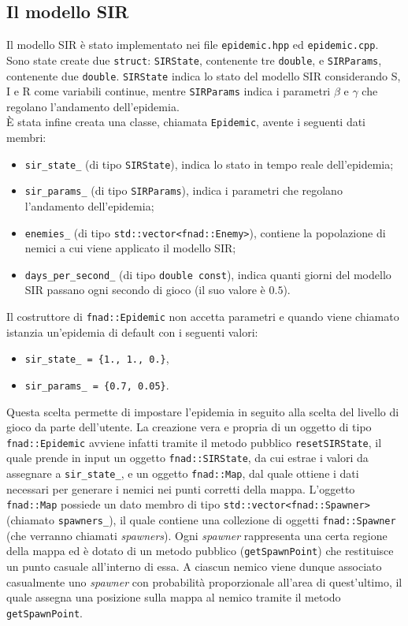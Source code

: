 \documentclass{article}
\begin{document}
\subsection{Il modello SIR}\label{section:sir}
Il modello SIR è stato implementato nei file \verb|epidemic.hpp| ed \verb|epidemic.cpp|. Sono state create due \verb|struct|: \verb|SIRState|, contenente tre \verb|double|, e \verb|SIRParams|, contenente due \verb|double|. \verb|SIRState| indica lo stato del modello SIR considerando S, I e R come variabili continue, mentre \verb|SIRParams| indica i parametri $\beta$ e $\gamma$ che regolano l'andamento dell'epidemia.\\
È stata infine creata una classe, chiamata \verb|Epidemic|, avente i seguenti dati membri:
\begin{itemize}
    \item \verb|sir_state_| (di tipo \verb|SIRState|), indica lo stato in tempo reale dell'epidemia;
    \item \verb|sir_params_| (di tipo \verb|SIRParams|), indica i parametri che regolano l'andamento dell'epidemia;
    \item  \verb|enemies_| (di tipo \verb|std::vector<fnad::Enemy>|), contiene la popolazione di nemici a cui viene applicato il modello SIR;
    \item \verb|days_per_second_| (di tipo \verb|double const|), indica quanti giorni del modello SIR passano ogni secondo di gioco (il suo valore è $0.5$).
\end{itemize}
Il costruttore di \verb|fnad::Epidemic| non accetta parametri e quando viene chiamato istanzia un'epidemia di default con i seguenti valori:
\begin{itemize}
    \item  \verb|sir_state_ = {1., 1., 0.}|,
    \item \verb|sir_params_ = {0.7, 0.05}|.
\end{itemize}
Questa scelta permette di impostare l'epidemia in seguito alla scelta del livello di gioco da parte dell'utente. La creazione vera e propria di un oggetto di tipo \verb|fnad::Epidemic| avviene infatti tramite il metodo pubblico \verb|resetSIRState|, il quale prende in input un oggetto \verb|fnad::SIRState|, da cui estrae i valori da assegnare a \verb|sir_state_|, e un oggetto \verb|fnad::Map|, dal quale ottiene i dati necessari per generare i nemici nei punti corretti della mappa. L'oggetto \verb|fnad::Map| possiede un dato membro di tipo \verb|std::vector<fnad::Spawner>| (chiamato \verb|spawners_|), il quale contiene una collezione di oggetti \verb|fnad::Spawner| (che verranno chiamati \textit{spawners}). Ogni \textit{spawner} rappresenta una certa regione della mappa ed è dotato di un metodo pubblico (\verb|getSpawnPoint|) che restituisce un punto casuale all'interno di essa. A ciascun nemico viene dunque associato casualmente uno \textit{spawner} con probabilità proporzionale all'area di quest'ultimo, il quale assegna una posizione sulla mappa al nemico tramite il metodo \verb|getSpawnPoint|.
\end{document}
